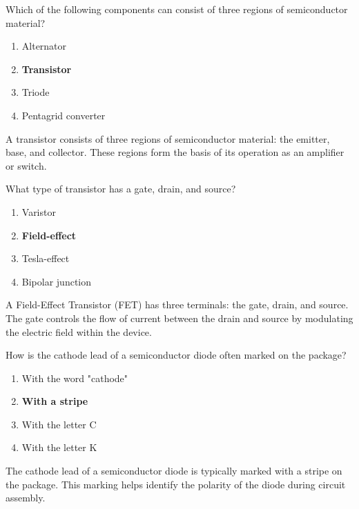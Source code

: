 \begin{tcolorbox}[colback=gray!10!white,colframe=black!75!black,title={T6B04}]
    Which of the following components can consist of three regions of semiconductor material?
    \begin{enumerate}[label=\Alph*,noitemsep]
        \item Alternator
        \item \textbf{Transistor}
        \item Triode
        \item Pentagrid converter
    \end{enumerate}
\end{tcolorbox}
A transistor consists of three regions of semiconductor material: the emitter, base, and collector. These regions form the basis of its operation as an amplifier or switch. %

\begin{tcolorbox}[colback=gray!10!white,colframe=black!75!black,title={T6B05}]
    What type of transistor has a gate, drain, and source?
    \begin{enumerate}[label=\Alph*,noitemsep]
        \item Varistor
        \item \textbf{Field-effect}
        \item Tesla-effect
        \item Bipolar junction
    \end{enumerate}
\end{tcolorbox}
A Field-Effect Transistor (FET) has three terminals: the gate, drain, and source. The gate controls the flow of current between the drain and source by modulating the electric field within the device. %

\begin{tcolorbox}[colback=gray!10!white,colframe=black!75!black,title={T6B06}]
    How is the cathode lead of a semiconductor diode often marked on the package?
    \begin{enumerate}[label=\Alph*,noitemsep]
        \item With the word "cathode"
        \item \textbf{With a stripe}
        \item With the letter C
        \item With the letter K
    \end{enumerate}
\end{tcolorbox}
The cathode lead of a semiconductor diode is typically marked with a stripe on the package. This marking helps identify the polarity of the diode during circuit assembly. %

